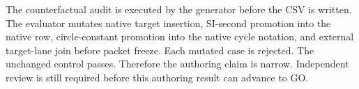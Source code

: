 The counterfactual audit is executed by the generator before the CSV is written.
The evaluator mutates native target insertion, SI-second promotion into the
native row, circle-constant promotion into the native cycle notation, and
external target-lane join before packet freeze.  Each mutated case is rejected.
The unchanged control passes.  Therefore the authoring claim is narrow.
Independent review is still required before this authoring result can advance
to GO.
